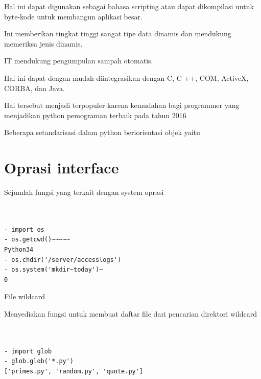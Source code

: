 {{{{{{{{{{{\vspace{\baselineskip}
\noindent 
Hal ini dapat digunakan sebagai bahasa scripting atau dapat dikompilasi untuk byte-kode untuk membangun aplikasi besar. \par
\vspace{\baselineskip}
\noindent 
Ini memberikan tingkat tinggi sangat tipe data dinamis dan mendukung memeriksa jenis dinamis. \par
\vspace{\baselineskip}
\noindent 
IT mendukung pengumpulan sampah otomatis. \par
\vspace{\baselineskip}
\noindent 
Hal ini dapat dengan mudah diintegrasikan dengan C, C ++, COM, ActiveX, CORBA, dan Java. \par
\vspace{\baselineskip}
\noindent 
Hal tersebut menjadi terpopuler karena kemudahan bagi programmer yang menjadikan python pemograman terbaik pada tahun 2016  \par
\vspace{\baselineskip}
\noindent 
Beberapa setandarisasi dalam python beriorientasi objek yaitu \par
\vspace{\baselineskip}
\noindent 
{\fontsize{14pt}{14pt}\section
{Oprasi interface}
\vspace{\baselineskip}
\noindent 
Sejumlah fungsi yang terkait dengan system oprasi \par
\vspace{\baselineskip}

\begin{verbatim}
	

- import os
- os.getcwd()~~~~~  
Python34
- os.chdir('/server/accesslogs')
- os.system('mkdir~today')~
0 
\end{verbatim} 
File wildcard \par
\vspace{\baselineskip}
\noindent 
Menyediakan fungsi untuk membuat daftar file dari pencarian direktori wildcard \par
\vspace{\baselineskip}

\begin{verbatim}
	

- import glob
- glob.glob('*.py')
['primes.py', 'random.py', 'quote.py'] 
\end{verbatim}

}}}}}}}}}}}}
